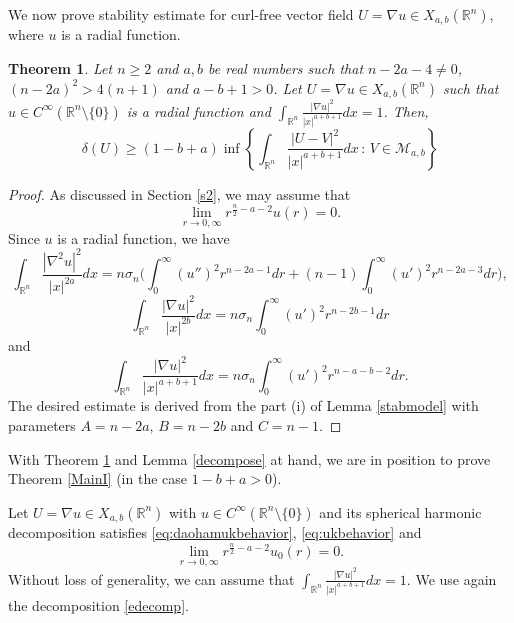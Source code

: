 \documentclass[a4paper,12pt]{article}
\theoremstyle{plain}
\newtheorem{theorem}{Theorem}[section]
\theoremstyle{definition}
\theoremstyle{remark}
\def\R{\mathbb R}%
\def\irn{\int_{\R^n}}
\numberwithin{equation}{section}
\begin{document}
We now prove stability estimate for curl-free vector field $U =\nabla u\in X_{a,b}(\R^n)$, where $u$ is  a radial function.
\begin{theorem}\label{radialtheo}
Let $n\geq 2$ and $a, b$ be real numbers such that $n-2a -4 \not=0$, $(n-2a)^2 > 4(n+1)$ and $a-b +1 >0$. Let $U = \nabla u \in X_{a,b}(\R^n)$ such that $u\in C^\infty(\R^n\setminus\{0\})$ is a radial function and $\irn \frac{|\nabla u|^2}{|x|^{a+b+1}} dx =1$. Then,
\begin{equation*}%
\delta(U) \geq (1-b+a) \inf\left\{\irn \frac{|U - V|^2}{|x|^{a+b+1}} dx\, :\, V \in \mathcal M_{a,b}\right\}
\end{equation*}
\end{theorem}
\begin{proof}
As discussed in Section \ref{s2}, we may  assume that 
\[
\lim_{r\to 0,\infty} r^{\frac n2 -a -2} u(r) =0.
\]
Since $u$ is a radial function, we have 
\[
\irn \frac{|\nabla^2 u|^2}{|x|^{2a}} dx =n\sigma_n \Bigg(\int_0^\infty (u'')^2 r^{n-2a -1} dr + (n-1) \int_0^\infty (u')^2 r^{n-2a -3} dr \Bigg),
\]
\[
\irn \frac{|\nabla u|^2}{|x|^{2b}} dx = n\sigma_n  \int_0^\infty (u')^2 r^{n-2b -1} dr
\]
and
\[
\irn \frac{|\nabla u|^2}{|x|^{a+b+1}} dx = n\sigma_n \int_0^\infty (u')^2 r^{n-a -b -2} dr.
\]
The desired estimate is derived from the part (i) of Lemma \ref{stabmodel} with parameters $A = n-2a$, $B = n-2b$ and $C = n-1$. 

\end{proof}
With  Theorem \ref{radialtheo} and Lemma \ref{decompose} at hand, we are in position to prove Theorem \ref{MainI} (in the case $1-b +a >0$).



Let $U =\nabla u\in X_{a,b}(\R^n)$ with $u\in C^\infty(\R^n\setminus\{0\})$ and its spherical harmonic decomposition satisfies \eqref{eq:daohamukbehavior}, \eqref{eq:ukbehavior} and
\[
\lim_{r\to 0,\infty} r^{\frac n2 -a -2} u_0(r) =0.
\]
Without loss of generality, we can assume that $\irn \frac{|\nabla u|^2}{|x|^{a+b+1}} dx =1$. We use again the decomposition \eqref{edecomp}.
\end{document}
